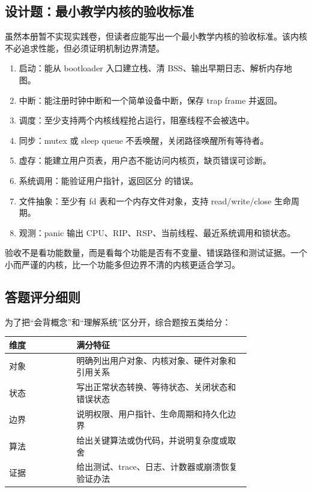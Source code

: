 \subsection{设计题：最小教学内核的验收标准}

虽然本册暂不实现实践卷，但读者应能写出一个最小教学内核的验收标准。该内核不必追求性能，但必须证明机制边界清楚。

\begin{enumerate}
\item 启动：能从 bootloader 入口建立栈、清 BSS、输出早期日志、解析内存地图。
\item 中断：能注册时钟中断和一个简单设备中断，保存 trap frame 并返回。
\item 调度：至少支持两个内核线程抢占运行，阻塞线程不会被选中。
\item 同步：mutex 或 sleep queue 不丢唤醒，关闭路径唤醒所有等待者。
\item 虚存：能建立用户页表，用户态不能访问内核页，缺页错误可诊断。
\item 系统调用：能验证用户指针，返回区分  的错误。
\item 文件抽象：至少有 fd 表和一个内存文件对象，支持 read/write/close 生命周期。
\item 观测：panic 输出 CPU、RIP、RSP、当前线程、最近系统调用和锁状态。
\end{enumerate}

\begin{rubricbox}
验收不是看功能数量，而是看每个功能是否有不变量、错误路径和测试证据。一个小而严谨的内核，比一个功能多但边界不清的内核更适合学习。
\end{rubricbox}

\subsection{答题评分细则}

为了把“会背概念”和“理解系统”区分开，综合题按五类给分：

\begin{longtable}{p{0.22\linewidth}p{0.58\linewidth}}
\toprule
维度 & 满分特征 \\
\midrule
对象 & 明确列出用户对象、内核对象、硬件对象和引用关系 \\
状态 & 写出正常状态转换、等待状态、关闭状态和错误状态 \\
边界 & 说明权限、用户指针、生命周期和持久化边界 \\
算法 & 给出关键算法或伪代码，并说明复杂度或取舍 \\
证据 & 给出测试、trace、日志、计数器或崩溃恢复验证办法 \\
\bottomrule
\end{longtable}

